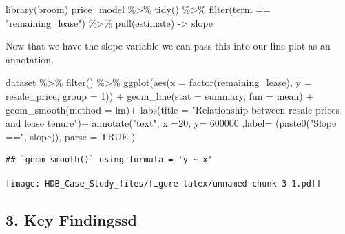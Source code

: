\documentclass[
]{article}
\newenvironment{Shaded}{\begin{snugshade}}{\end{snugshade}}
\newcommand{\AttributeTok}[1]{\textcolor[rgb]{0.77,0.63,0.00}{#1}}
\newcommand{\ConstantTok}[1]{\textcolor[rgb]{0.00,0.00,0.00}{#1}}
\newcommand{\DecValTok}[1]{\textcolor[rgb]{0.00,0.00,0.81}{#1}}
\newcommand{\FunctionTok}[1]{\textcolor[rgb]{0.00,0.00,0.00}{#1}}
\newcommand{\NormalTok}[1]{#1}
\newcommand{\OtherTok}[1]{\textcolor[rgb]{0.56,0.35,0.01}{#1}}
\newcommand{\SpecialCharTok}[1]{\textcolor[rgb]{0.00,0.00,0.00}{#1}}
\newcommand{\StringTok}[1]{\textcolor[rgb]{0.31,0.60,0.02}{#1}}
\begin{document}
\begin{Shaded}
\begin{Highlighting}[]
\FunctionTok{library}\NormalTok{(broom)}
\NormalTok{price\_model }\SpecialCharTok{\%\textgreater{}\%} 
  \FunctionTok{tidy}\NormalTok{() }\SpecialCharTok{\%\textgreater{}\%} 
  \FunctionTok{filter}\NormalTok{(term }\SpecialCharTok{==} \StringTok{"remaining\_lease"}\NormalTok{) }\SpecialCharTok{\%\textgreater{}\%} 
  \FunctionTok{pull}\NormalTok{(estimate) }\OtherTok{{-}\textgreater{}}\NormalTok{ slope}
\end{Highlighting}
\end{Shaded}

Now that we have the slope variable we can pass this into our line plot
as an annotation.

\begin{Shaded}
\begin{Highlighting}[]
\NormalTok{dataset }\SpecialCharTok{\%\textgreater{}\%} 
  \FunctionTok{filter}\NormalTok{() }\SpecialCharTok{\%\textgreater{}\%} 
  \FunctionTok{ggplot}\NormalTok{(}\FunctionTok{aes}\NormalTok{(}\AttributeTok{x =} \FunctionTok{factor}\NormalTok{(remaining\_lease), }\AttributeTok{y =}\NormalTok{ resale\_price, }\AttributeTok{group =} \DecValTok{1}\NormalTok{)) }\SpecialCharTok{+}
  \FunctionTok{geom\_line}\NormalTok{(}\AttributeTok{stat =} \StringTok{\textquotesingle{}summary\textquotesingle{}}\NormalTok{, }\AttributeTok{fun =} \StringTok{\textquotesingle{}mean\textquotesingle{}}\NormalTok{) }\SpecialCharTok{+}
  \FunctionTok{geom\_smooth}\NormalTok{(}\AttributeTok{method =} \StringTok{\textquotesingle{}lm\textquotesingle{}}\NormalTok{)}\SpecialCharTok{+}
  \FunctionTok{labs}\NormalTok{(}\AttributeTok{title =} \StringTok{"Relationship between resale prices and lease tenure"}\NormalTok{)}\SpecialCharTok{+}
  \FunctionTok{annotate}\NormalTok{(}\StringTok{"text"}\NormalTok{, }\AttributeTok{x =}\DecValTok{20}\NormalTok{, }\AttributeTok{y=} \DecValTok{600000}\NormalTok{ ,}\AttributeTok{label=}\NormalTok{ (}\FunctionTok{paste0}\NormalTok{(}\StringTok{"Slope =="}\NormalTok{, slope)), }\AttributeTok{parse =} \ConstantTok{TRUE}\NormalTok{ )}
\end{Highlighting}
\end{Shaded}

\begin{verbatim}
## `geom_smooth()` using formula = 'y ~ x'
\end{verbatim}

\texttt{[image: HDB\_Case\_Study\_files/figure-latex/unnamed-chunk-3-1.pdf]}

\hypertarget{key-findingssd}{%
\subsection{3. Key Findingssd}\label{key-findingssd}}
\end{document}
